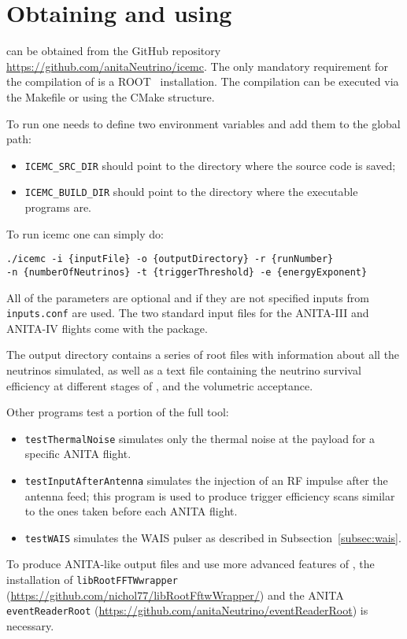 \appendix

\section{Obtaining and using \icemc}
\icemc can be obtained from the GitHub repository \url{https://github.com/anitaNeutrino/icemc}.
The only mandatory requirement for the compilation of \icemc is a ROOT~\cite{brun1997root} installation.
The compilation can be executed via the Makefile or using the CMake structure.

To run \icemc one needs to define two environment variables and add them to the global path:
\begin{itemize}
    \item  \texttt{ICEMC\_SRC\_DIR} should point to the directory where the source code is saved;
    \item  \texttt{ICEMC\_BUILD\_DIR} should point to the directory where the executable programs are.
\end{itemize}

To run icemc one can simply do:
\begin{verbatim}
./icemc -i {inputFile} -o {outputDirectory} -r {runNumber}
-n {numberOfNeutrinos} -t {triggerThreshold} -e {energyExponent}
\end{verbatim}

All of the parameters are optional and if they are not specified inputs from \texttt{inputs.conf} are used. 
The two standard input files for the ANITA-III and ANITA-IV flights come with the package.

The output directory contains a series of root files with  information about all the neutrinos simulated, as well as a text file containing the neutrino survival efficiency at different stages of \icemc, and the volumetric acceptance.

Other programs test a portion of the full \icemc tool:
\begin{itemize}
    \item {\tt testThermalNoise} simulates only the thermal noise at the payload for a specific ANITA flight.
    \item {\tt testInputAfterAntenna} simulates the injection of an RF impulse after the antenna feed; this program is used to produce trigger efficiency scans similar to the ones taken before each ANITA flight.
    \item {\tt testWAIS} simulates the WAIS pulser as described in Subsection~\ref{subsec:wais}.
\end{itemize}

To produce ANITA-like output files and use more advanced features of \icemc, the installation of \texttt{libRootFFTWwrapper} (\url{https://github.com/nichol77/libRootFftwWrapper/}) and the ANITA \texttt{eventReaderRoot} (\url{https://github.com/anitaNeutrino/eventReaderRoot}) is necessary. 

